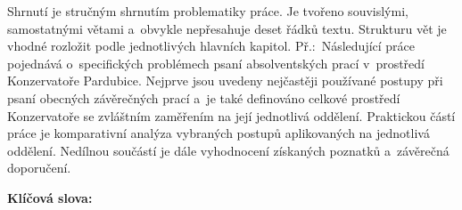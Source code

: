 \noindent
Shrnutí je stručným shrnutím problematiky práce. Je tvořeno souvislými,
samostatnými větami a~obvykle nepřesahuje deset řádků textu. Strukturu vět je
vhodné rozložit podle jednotlivých hlavních kapitol. Př.:~Následující práce
pojednává o~specifických problémech psaní absolventských prací v~prostředí
Konzervatoře Pardubice. Nejprve jsou uvedeny nejčastěji používané postupy při
psaní obecných závěrečných prací a~je také definováno celkové prostředí
Konzervatoře se zvláštním zaměřením na její jednotlivá oddělení. Praktickou
částí práce je komparativní analýza vybraných postupů aplikovaných na jednotlivá
oddělení. Nedílnou součástí je dále vyhodnocení získaných poznatků a~závěrečná
doporučení.

\noindent
\textbf{Klíčová slova: } \klicovaslova
